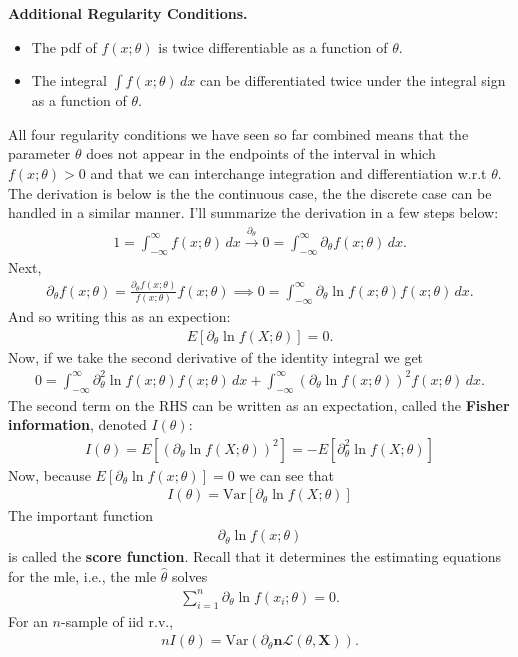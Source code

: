 \documentclass{book}
\theoremstyle{definition}
\newcommand{\p}{\partial}
\newcommand{\lag}{\mathcal{L}}
\newcommand{\n}{\mathbf{n}}
\newcommand{\f}[2]{\frac{#1}{#2}}
\newcommand{\lp}{\left(}
\newcommand{\rp}{\right)}
\newcommand{\lb}{\left[}
\newcommand{\rb}{\right]}
\begin{document}
\noindent \textbf{Additional Regularity Conditions.} 
\begin{itemize}
	\item The pdf of $f(x;\theta)$ is twice differentiable as a function of $\theta$.
	\item The integral $\int f(x;\theta)\,dx$ can be differentiated twice under the integral sign as a function of $\theta$.
\end{itemize}


All four regularity conditions we have seen so far combined means that the parameter $\theta$ does not appear in the endpoints of the interval in which $f(x;\theta) > 0$ and that we can interchange integration and differentiation w.r.t $\theta$. The derivation is below is the the continuous case, the the discrete case can be handled in a similar manner. I'll summarize the derivation in a few steps below:
\begin{align}
1 = \int^\infty_{-\infty} f(x;\theta)\,dx \xrightarrow{\p_\theta} 0  = \int^\infty_{-\infty} \p_\theta f(x;\theta)\,dx.  
\end{align}
Next, 
\begin{align}
\p_\theta f(x;\theta) = \f{\p_\theta f(x;\theta)}{f(x;\theta)} f(x;\theta) \implies 0 = \int^\infty_{-\infty} {\p_\theta \ln f(x;\theta)} f(x;\theta)\,dx.
\end{align}
And so writing this as an expection:
\begin{align}
E\lb {\p_\theta \ln f(X;\theta)} \rb = 0. 
\end{align}
Now, if we take the second derivative of the identity integral we get
\begin{align}
0 = \int^\infty_{-\infty} \p^2_\theta \ln f(x;\theta)f(x;\theta)\,dx + \int^\infty_{-\infty} \lp \p_\theta \ln f(x;\theta) \rp^2 f(x;\theta)\,dx.
\end{align}
The second term on the RHS can be written as an expectation, called the \textbf{Fisher information}, denoted $I(\theta)$:
\begin{align}
\boxed{ I(\theta) = E\lb \lp \p_\theta \ln f(X;\theta) \rp^2 \rb = -E\lb \p_\theta^2 \ln f(X;\theta)  \rb}
\end{align}
Now, because $E\lb {\p_\theta \ln f(x;\theta)} \rb = 0$ we can see that 
\begin{align}
\boxed{I(\theta) = \text{Var}\lb \p_\theta \ln f(X;\theta) \rb}
\end{align}
The important function 
\begin{align}
\p_\theta \ln f(x;\theta)
\end{align}
is called the \textbf{score function}. Recall that it determines the estimating equations for the mle, i.e., the mle $\hat\theta$ solves
\begin{align}
\sum^n_{i=1} \p_\theta \ln f(x_i;\theta) = 0.
\end{align}
For an $n$-sample of iid r.v., 
\begin{align}
nI(\theta) = \text{Var}\lp \p_\theta \n \lag (\theta,\mathbf{X}) \rp.
\end{align}
\end{document}
